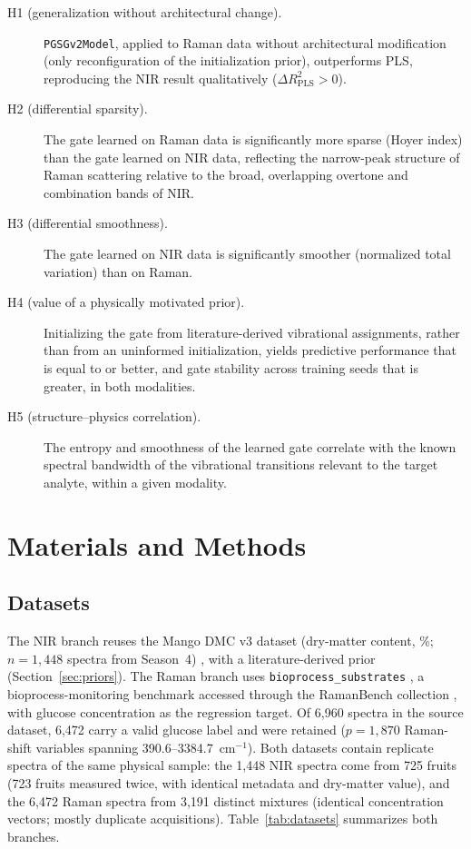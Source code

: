 \documentclass[preprint,12pt]{elsarticle}
\begin{document}
\begin{description}
\item[H1 (generalization without architectural change).] \texttt{PGSGv2Model}, applied to Raman data without architectural modification (only reconfiguration of the initialization prior), outperforms PLS, reproducing the NIR result qualitatively ($\Delta R^{2}_{\mathrm{PLS}}>0$).
\item[H2 (differential sparsity).] The gate learned on Raman data is significantly more sparse (Hoyer index) than the gate learned on NIR data, reflecting the narrow-peak structure of Raman scattering relative to the broad, overlapping overtone and combination bands of NIR.
\item[H3 (differential smoothness).] The gate learned on NIR data is significantly smoother (normalized total variation) than on Raman.
\item[H4 (value of a physically motivated prior).] Initializing the gate from literature-derived vibrational assignments, rather than from an uninformed initialization, yields predictive performance that is equal to or better, and gate stability across training seeds that is greater, in both modalities.
\item[H5 (structure--physics correlation).] The entropy and smoothness of the learned gate correlate with the known spectral bandwidth of the vibrational transitions relevant to the target analyte, within a given modality.
\end{description}

\section{Materials and Methods}
\label{sec:methods}

\subsection{Datasets}
\label{sec:datasets}

The NIR branch reuses the Mango DMC v3 dataset (dry-matter content, \%; $n=1{,}448$ spectra from Season~4) \cite{anderson2020}, with a literature-derived prior \cite{saranwong2004} (Section~\ref{sec:priors}). The Raman branch uses \texttt{bioprocess\_substrates} \cite{lange2026}, a bioprocess-monitoring benchmark accessed through the RamanBench collection \cite{koddenbrock2026}, with glucose concentration as the regression target. Of 6,960 spectra in the source dataset, 6,472 carry a valid glucose label and were retained ($p=1{,}870$ Raman-shift variables spanning 390.6--3384.7~cm$^{-1}$). Both datasets contain replicate spectra of the same physical sample: the 1,448 NIR spectra come from 725 fruits (723 fruits measured twice, with identical metadata and dry-matter value), and the 6,472 Raman spectra from 3,191 distinct mixtures (identical concentration vectors; mostly duplicate acquisitions). Table~\ref{tab:datasets} summarizes both branches.
\end{document}

